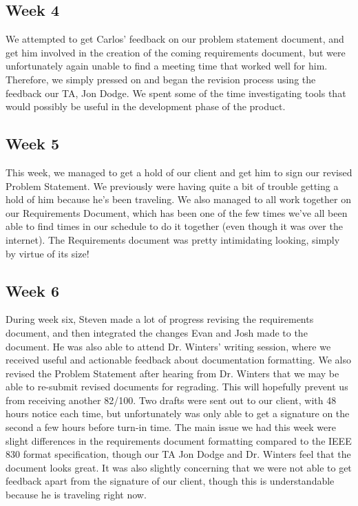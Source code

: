 \documentclass[onecolumn, draftclsnofoot,10pt, compsoc]{IEEEtran}
\begin{document}
\subsection{Week 4}
We attempted to get Carlos' feedback on our problem statement document, 
and get him involved in the creation of the coming requirements document, 
but were unfortunately again unable to find a meeting time that worked 
well for him. Therefore, we simply pressed on and began the revision process 
using the feedback our TA, Jon Dodge. We spent some of the time investigating 
tools that would possibly be useful in the development phase of the product.

\subsection{Week 5}
This week, we managed to get a hold of our client and get him to sign our 
revised Problem Statement. We previously were having quite a bit of trouble 
getting a hold of him because he's been traveling. We also managed to all 
work together on our Requirements Document, which has been one of the few 
times we've all been able to find times in our schedule to do it together 
(even though it was over the internet). The Requirements document was 
pretty intimidating looking, simply by virtue of its size!

\subsection{Week 6}
During week six, Steven made a lot of progress revising the requirements document, 
and then integrated the changes Evan and Josh made to the document. He was also able 
to attend Dr. Winters' writing session, where we received useful and actionable 
feedback about documentation formatting. We also revised the Problem Statement 
after hearing from Dr. Winters that we may be able to re-submit revised documents 
for regrading. This will hopefully prevent us from receiving another 82/100. 
Two drafts were sent out to our client, with 48 hours notice each time, but 
unfortunately was only able to get a signature on the second a few hours before 
turn-in time. The main issue we had this week were slight differences in the 
requirements document formatting compared to the IEEE 830 format specification, 
though our TA Jon Dodge and Dr. Winters feel that the document looks great. 
It was also slightly concerning that we were not able to get feedback apart 
from the signature of our client, though this is understandable because he is 
traveling right now.
\end{document}
